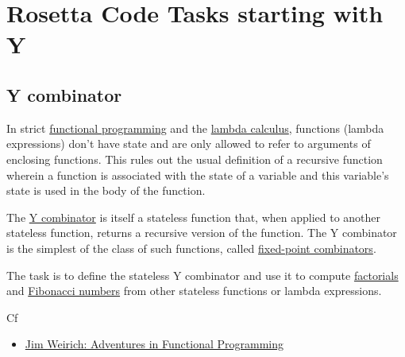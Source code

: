 %
%
%

\chapter{Rosetta Code Tasks starting with Y}

\section*{Y combinator}

In strict
\href{http://en.wikipedia.org/wiki/Functional\_programming}{functional
  programming} and the
\href{http://en.wikipedia.org/wiki/lambda\_calculus}{lambda calculus},
functions (lambda expressions) don't have state and are only allowed
to refer to arguments of enclosing functions. This rules out the usual
definition of a recursive function wherein a function is associated
with the state of a variable and this variable's state is used in the
body of the function.

The \href{http://mvanier.livejournal.com/2897.html}{Y combinator} is
itself a stateless function that, when applied to another stateless
function, returns a recursive version of the function. The Y combinator
is the simplest of the class of such functions, called
\href{http://en.wikipedia.org/wiki/Fixed-point\_combinator}{fixed-point
combinators}.

The task is to define the stateless Y combinator and use it to compute
\href{http://en.wikipedia.org/wiki/Factorial}{factorials} and
\href{http://en.wikipedia.org/wiki/Fibonacci\_number}{Fibonacci numbers}
from other stateless functions or lambda expressions.

\begin{description}
\item[Cf]
\end{description}

\begin{itemize}
\item
  \href{http://vimeo.com/45140590}{Jim Weirich: Adventures in Functional
  Programming}
\end{itemize}



